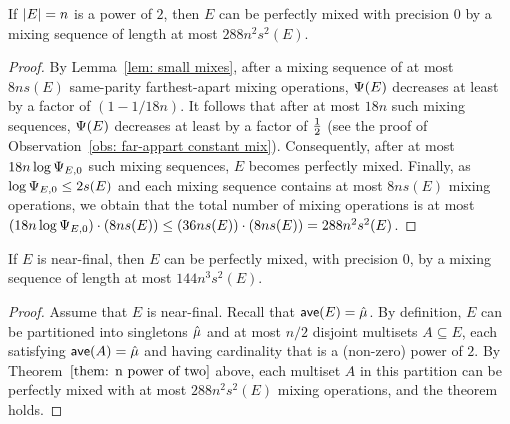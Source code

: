 \begin{theorem} \label{them: n power of two}
	If ${|E|}=n$ is a power of $2$, then
	$E$ can be perfectly mixed with precision $0$ 
	by a mixing sequence of length at most $288n^2s^2(E)$.
\end{theorem}

\begin{proof}
	By Lemma~\ref{lem: small mixes}, after a mixing sequence of at most $8ns(E)$ 
	same-parity farthest-apart mixing operations,
	${\Psi}(E)$ decreases at least by a factor of $ (1-1/18n)$.
	It follows that  after at most $18n$ such mixing sequences, ${\Psi}(E)$ decreases
	at least by a factor of ${\textstyle\frac{1}{2}}$ (see the proof of Observation~\ref{obs: far-appart constant mix}).   
	Consequently, after at most $18n\log{{\Psi}_{E,0}}$ such mixing sequences,
	$E$ becomes perfectly mixed.	
	Finally, as $\log {{\Psi}_{E,0}} \le 2 s(E)$ and 
	each mixing sequence contains at most $8ns(E)$ mixing operations,
	we obtain that the total number of mixing operations is at most 
	$(18n\log{{\Psi}_{E,0}})\cdot (8ns(E)) \le (36ns(E)) \cdot (8ns(E)) = 288n^2s^2(E)$.
\end{proof}


\begin{theorem}\label{thm: E near-final}
	If $E$ is near-final, then $E$ can be perfectly mixed, with precision $0$,
	by a mixing sequence of length at most $144n^3s^2(E)$.
\end{theorem}

\begin{proof}
	Assume that $E$ is near-final. Recall that ${\textsf{ave}}(E) = {\hat{\mu}}$.
	By definition, $E$ can be partitioned into singletons ${\hat{\mu}}$ and
	at most $n/2$ disjoint multisets $A\subseteq E$, each satisfying ${\textsf{ave}}(A) = {\hat{\mu}}$
	and having cardinality that is a (non-zero) power of $2$.
	By Theorem~$\ref{them: n power of two}$ above,
	each multiset $A$ in this partition can be perfectly mixed with at most $288n^2s^2(E)$ mixing operations,
	and the theorem holds.
\end{proof}